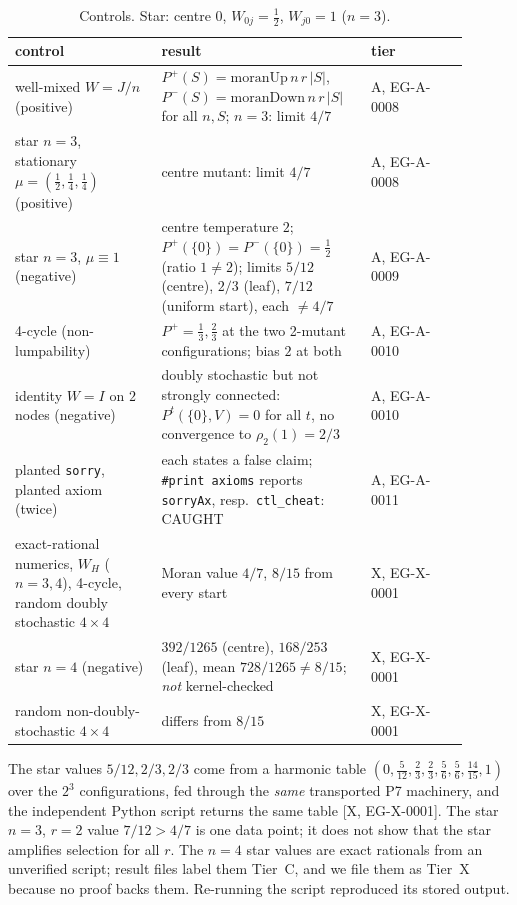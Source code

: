 \documentclass[11pt]{article}
\newcommand{\tier}[1]{\textsf{[#1]}}
\newcommand{\lean}[1]{\texttt{#1}}
\begin{document}
\begin{table}[ht]\centering\small
\begin{tabular}{p{0.30\linewidth}p{0.40\linewidth}p{0.20\linewidth}}
\toprule
control & result & tier\\
\midrule
well-mixed $W=J/n$ (positive) & $P^{+}(S)=\mathrm{moranUp}\,n\,r\,|S|$, $P^{-}(S)=\mathrm{moranDown}\,n\,r\,|S|$ for all $n,S$; $n=3$: limit $4/7$ & A, EG-A-0008\\
star $n=3$, stationary $\mu=(\tfrac12,\tfrac14,\tfrac14)$ (positive) & centre mutant: limit $4/7$ & A, EG-A-0008\\
star $n=3$, $\mu\equiv1$ (negative) & centre temperature $2$; $P^{+}(\{0\})=P^{-}(\{0\})=\tfrac12$ (ratio $1\neq2$); limits $5/12$ (centre), $2/3$ (leaf), $7/12$ (uniform start), each $\neq4/7$ & A, EG-A-0009\\
4-cycle (non-lumpability) & $P^{+}=\tfrac13,\tfrac23$ at the two 2-mutant configurations; bias $2$ at both & A, EG-A-0010\\
identity $W=I$ on $2$ nodes (negative) & doubly stochastic but not strongly connected: $P^t(\{0\},V)=0$ for all $t$, no convergence to $\rho_2(1)=2/3$ & A, EG-A-0010\\
planted \lean{sorry}, planted axiom (twice) & each states a false claim; \lean{\#print axioms} reports \lean{sorryAx}, resp.\ \lean{ctl\_cheat}: CAUGHT & A, EG-A-0011\\
exact-rational numerics, $W_H$ ($n=3,4$), 4-cycle, random doubly stochastic $4\times4$ & Moran value $4/7$, $8/15$ from every start & X, EG-X-0001\\
star $n=4$ (negative) & $392/1265$ (centre), $168/253$ (leaf), mean $728/1265\neq8/15$; \emph{not} kernel-checked & X, EG-X-0001\\
random non-doubly-stochastic $4\times4$ & differs from $8/15$ & X, EG-X-0001\\
\bottomrule
\end{tabular}
\caption{Controls. Star: centre $0$, $W_{0j}=\tfrac12$, $W_{j0}=1$ ($n=3$).}\label{tab:ctl}
\end{table}

The star values $5/12,2/3,2/3$ come from a harmonic table $(0,\tfrac5{12},\tfrac23,\tfrac23,\tfrac56,\tfrac56,\tfrac{14}{15},1)$ over the $2^3$ configurations, fed through the \emph{same} transported P7 machinery, and the independent Python script returns the same table \tier{X, EG-X-0001}. The star $n=3$, $r=2$ value $7/12>4/7$ is one data point; it does not show that the star amplifies selection for all $r$. The $n=4$ star values are exact rationals from an unverified script; result files label them Tier~C, and we file them as Tier~X because no proof backs them. Re-running the script reproduced its stored output.
\end{document}
